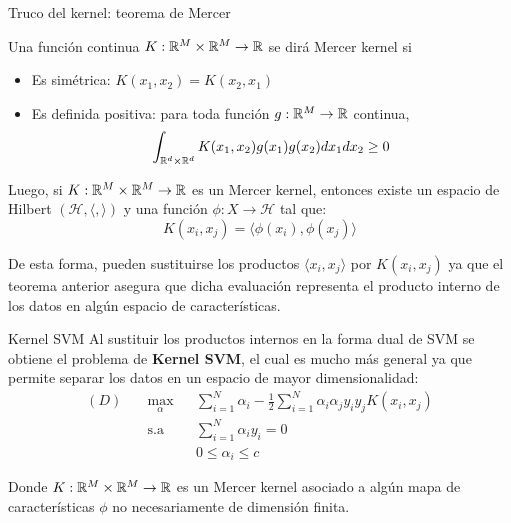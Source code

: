 \documentclass[handout, 9pt]{beamer}
\begin{document}
\begin{frame}{Truco del kernel: teorema de Mercer}

\begin{theorem}

Una función continua $K: \mathbb{R}^M\times \mathbb{R}^M \to \mathbb{R}$ se dirá Mercer kernel si

\begin{itemize}
    \item Es simétrica: $K(x_1 , x_2 ) = K (x_2 , x_1)$
    \item Es definida positiva: para toda función $g:\mathbb{R}^M\rightarrow\mathbb{R}$ continua,
    $$\int_{\mathbb{R}^d\times\mathbb{R}^d} K(x_1, x_2)g(x_1) g(x_2) dx_1 dx_2\geq 0$$
    
\end{itemize}

Luego, si $K: \mathbb{R}^M\times \mathbb{R}^M \to \mathbb{R}$ es un Mercer kernel, entonces existe un espacio de Hilbert $\left(\mathcal{H},\langle,\rangle\right)$ y una función $\phi: X \to \mathcal{H}$ tal que:
	\begin{equation*}
    K(x_i, x_j) = \langle \phi(x_i) , \phi(x_j) \rangle
\end{equation*}
\end{theorem}

De esta forma, pueden sustituirse los productos $\langle x_i,x_j\rangle$ por $K(x_i, x_j)$ ya que el teorema anterior asegura que dicha evaluación representa el producto interno de los datos en algún espacio de características.

\end{frame}

\begin{frame}{Kernel SVM}
	Al sustituir los productos internos en la forma dual de SVM se obtiene el problema de \textbf{Kernel SVM}, el cual es mucho más general ya que permite separar los datos en un espacio de mayor dimensionalidad:
\begin{equation*}
\begin{aligned}
(D)\quad & \underset{\alpha}{\text{max}}
& & \sum\limits_{i=1}^{N}\alpha_i - \frac{1}{2} \sum\limits_{i=1}^{N} \alpha_i \alpha_j y_i y_j K(x_i, x_j)\\
& \text{s.a}
& & \sum\limits_{i=1}^{N} \alpha_i y_i= 0 \\
& &  &0 \leq \alpha_i \leq c
\end{aligned}
\end{equation*}

Donde $K: \mathbb{R}^M\times \mathbb{R}^M \to \mathbb{R}$ es un Mercer kernel asociado a algún mapa de características $\phi$ no necesariamente de dimensión finita.

\end{frame}
\end{document}
